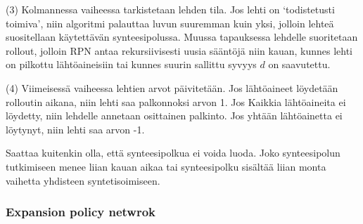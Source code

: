 \documentclass[finnish,twoside,censored,tkt,sw-line]{HYthesisML}
\begin{document}
(3) Kolmannessa vaiheessa tarkistetaan lehden tila.
Jos lehti on `todistetusti toimiva', niin algoritmi palauttaa luvun suuremman kuin yksi, jolloin lehteä suositellaan käytettävän synteesipolussa.
Muussa tapauksessa lehdelle suoritetaan rollout, jolloin RPN antaa rekursiivisesti uusia sääntöjä niin kauan, kunnes lehti on pilkottu lähtöaineisiin tai kunnes suurin sallittu syvyys \(d\) on saavutettu.

(4) Viimeisessä vaiheessa lehtien arvot päivitetään.
Jos lähtöaineet löydetään rolloutin aikana, niin lehti saa palkonnoksi arvon 1.
Jos Kaikkia lähtöaineita ei löydetty, niin lehdelle annetaan osittainen palkinto.
Jos yhtään lähtöainetta ei löytynyt, niin lehti saa arvon -1.

Saattaa kuitenkin olla, että synteesipolkua ei voida luoda.
Joko synteesipolun tutkimiseen menee liian kauan aikaa tai synteesipolku sisältää liian monta vaihetta yhdisteen syntetisoimiseen.


\subsubsection{Expansion policy netwrok}
\end{document}
